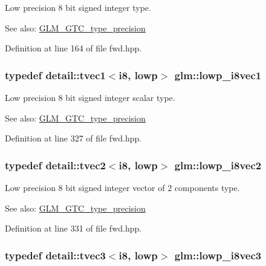 Low precision 8 bit signed integer type. \begin{Desc}
\item[See also:]\hyperlink{group__gtc__type__precision}{GLM\_\-GTC\_\-type\_\-precision} \end{Desc}


Definition at line 164 of file fwd.hpp.\hypertarget{group__gtc__type__precision_g490ff77964d0386c1db936eb2a324988}{
\subsubsection[lowp\_\-i8vec1]{\setlength{\rightskip}{0pt plus 5cm}typedef detail::tvec1$<$i8, lowp$>$ {\bf glm::lowp\_\-i8vec1}}}
\label{group__gtc__type__precision_g490ff77964d0386c1db936eb2a324988}


Low precision 8 bit signed integer scalar type. \begin{Desc}
\item[See also:]\hyperlink{group__gtc__type__precision}{GLM\_\-GTC\_\-type\_\-precision} \end{Desc}


Definition at line 327 of file fwd.hpp.\hypertarget{group__gtc__type__precision_g511280c8869c7c79bba3c359f37f5559}{
\subsubsection[lowp\_\-i8vec2]{\setlength{\rightskip}{0pt plus 5cm}typedef detail::tvec2$<$i8, lowp$>$ {\bf glm::lowp\_\-i8vec2}}}
\label{group__gtc__type__precision_g511280c8869c7c79bba3c359f37f5559}


Low precision 8 bit signed integer vector of 2 components type. \begin{Desc}
\item[See also:]\hyperlink{group__gtc__type__precision}{GLM\_\-GTC\_\-type\_\-precision} \end{Desc}


Definition at line 331 of file fwd.hpp.\hypertarget{group__gtc__type__precision_g048811f03c327d4b56564a72d98800e8}{
\subsubsection[lowp\_\-i8vec3]{\setlength{\rightskip}{0pt plus 5cm}typedef detail::tvec3$<$i8, lowp$>$ {\bf glm::lowp\_\-i8vec3}}}
\label{group__gtc__type__precision_g048811f03c327d4b56564a72d98800e8}


